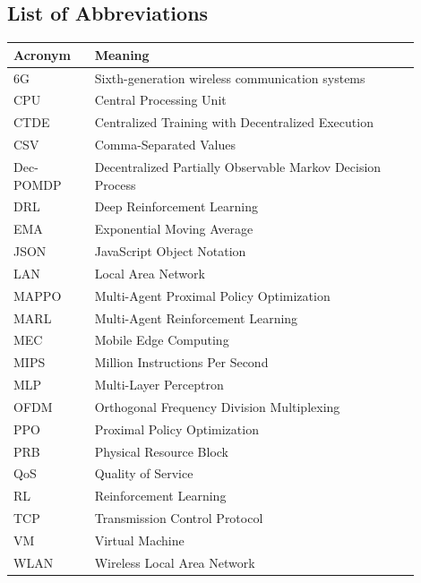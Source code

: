 \newpage
\begin{center}
  \section*{List of Abbreviations}
\end{center}

\begin{longtable}{p{0.18\linewidth}p{0.72\linewidth}}
\textbf{Acronym} & \textbf{Meaning} \\
\hline
6G & Sixth-generation wireless communication systems \\
CPU & Central Processing Unit \\
CTDE & Centralized Training with Decentralized Execution \\
CSV & Comma-Separated Values \\
Dec-POMDP & Decentralized Partially Observable Markov Decision Process \\
DRL & Deep Reinforcement Learning \\
EMA & Exponential Moving Average \\
JSON & JavaScript Object Notation \\
LAN & Local Area Network \\
MAPPO & Multi-Agent Proximal Policy Optimization \\
MARL & Multi-Agent Reinforcement Learning \\
MEC & Mobile Edge Computing \\
MIPS & Million Instructions Per Second \\
MLP & Multi-Layer Perceptron \\
OFDM & Orthogonal Frequency Division Multiplexing \\
PPO & Proximal Policy Optimization \\
PRB & Physical Resource Block \\
QoS & Quality of Service \\
RL & Reinforcement Learning \\
TCP & Transmission Control Protocol \\
VM & Virtual Machine \\
WLAN & Wireless Local Area Network \\
\end{longtable}

\setcounter{table}{0}
